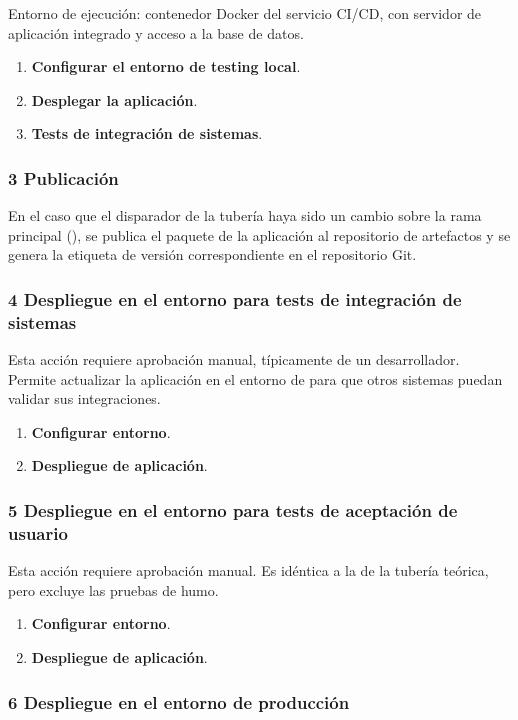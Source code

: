Entorno de ejecución: contenedor Docker del servicio CI/CD, con
servidor de aplicación integrado y acceso a la base de datos.

\begin{enumerate}
\item \textbf{Configurar el entorno de testing local}.
\item \textbf{Desplegar la aplicación}.
\item \textbf{Tests de integración de sistemas}.
\end{enumerate}
\subsubsection{3 Publicación}

En el caso que el disparador de la tubería haya sido un cambio sobre
la rama principal (), se publica el paquete de la
aplicación al repositorio de artefactos y se genera la etiqueta de
versión correspondiente en el repositorio Git.

\subsubsection{4 Despliegue en el entorno para tests de integración de sistemas}

Esta acción requiere aprobación manual, típicamente de un
desarrollador. Permite actualizar la aplicación en el entorno de
 para que otros sistemas puedan validar sus
integraciones.

\begin{enumerate}
\item \textbf{Configurar entorno}.
\item \textbf{Despliegue de aplicación}.
\end{enumerate}
\subsubsection{5 Despliegue en el entorno para tests de aceptación de usuario}

Esta acción requiere aprobación manual. Es idéntica a la de la tubería
teórica, pero excluye las pruebas de humo.

\begin{enumerate}
\item \textbf{Configurar entorno}.
\item \textbf{Despliegue de aplicación}.
\end{enumerate}
\subsubsection{6 Despliegue en el entorno de producción}

